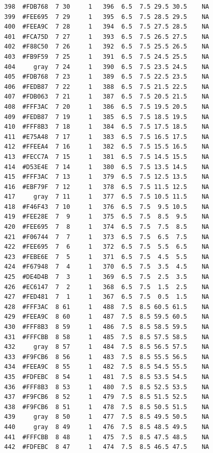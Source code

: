 \documentclass[12pt,twoside]{reedthesis}
\begin{document}
\begin{verbatim}
  398  #FDB768  7 30     1   396  6.5  7.5 29.5 30.5    NA
  399  #FEE695  7 29     1   395  6.5  7.5 28.5 29.5    NA
  400  #FEEA9C  7 28     1   394  6.5  7.5 27.5 28.5    NA
  401  #FCA75D  7 27     1   393  6.5  7.5 26.5 27.5    NA
  402  #F88C50  7 26     1   392  6.5  7.5 25.5 26.5    NA
  403  #FB9F59  7 25     1   391  6.5  7.5 24.5 25.5    NA
  404     gray  7 24     1   390  6.5  7.5 23.5 24.5    NA
  405  #FDB768  7 23     1   389  6.5  7.5 22.5 23.5    NA
  406  #FEDB87  7 22     1   388  6.5  7.5 21.5 22.5    NA
  407  #FDB063  7 21     1   387  6.5  7.5 20.5 21.5    NA
  408  #FFF3AC  7 20     1   386  6.5  7.5 19.5 20.5    NA
  409  #FEDB87  7 19     1   385  6.5  7.5 18.5 19.5    NA
  410  #FFF8B3  7 18     1   384  6.5  7.5 17.5 18.5    NA
  411  #E75A48  7 17     1   383  6.5  7.5 16.5 17.5    NA
  412  #FFEEA4  7 16     1   382  6.5  7.5 15.5 16.5    NA
  413  #FECC7A  7 15     1   381  6.5  7.5 14.5 15.5    NA
  414  #D53E4E  7 14     1   380  6.5  7.5 13.5 14.5    NA
  415  #FFF3AC  7 13     1   379  6.5  7.5 12.5 13.5    NA
  416  #EBF79F  7 12     1   378  6.5  7.5 11.5 12.5    NA
  417     gray  7 11     1   377  6.5  7.5 10.5 11.5    NA
  418  #F46F43  7 10     1   376  6.5  7.5  9.5 10.5    NA
  419  #FEE28E  7  9     1   375  6.5  7.5  8.5  9.5    NA
  420  #FEE695  7  8     1   374  6.5  7.5  7.5  8.5    NA
  421  #F06744  7  7     1   373  6.5  7.5  6.5  7.5    NA
  422  #FEE695  7  6     1   372  6.5  7.5  5.5  6.5    NA
  423  #FEBE6E  7  5     1   371  6.5  7.5  4.5  5.5    NA
  424  #F67948  7  4     1   370  6.5  7.5  3.5  4.5    NA
  425  #DE4D4B  7  3     1   369  6.5  7.5  2.5  3.5    NA
  426  #EC6147  7  2     1   368  6.5  7.5  1.5  2.5    NA
  427  #FED481  7  1     1   367  6.5  7.5  0.5  1.5    NA
  428  #FFF3AC  8 61     1   488  7.5  8.5 60.5 61.5    NA
  429  #FEEA9C  8 60     1   487  7.5  8.5 59.5 60.5    NA
  430  #FFF8B3  8 59     1   486  7.5  8.5 58.5 59.5    NA
  431  #FFFCBB  8 58     1   485  7.5  8.5 57.5 58.5    NA
  432     gray  8 57     1   484  7.5  8.5 56.5 57.5    NA
  433  #F9FCB6  8 56     1   483  7.5  8.5 55.5 56.5    NA
  434  #FEEA9C  8 55     1   482  7.5  8.5 54.5 55.5    NA
  435  #FDFEBC  8 54     1   481  7.5  8.5 53.5 54.5    NA
  436  #FFF8B3  8 53     1   480  7.5  8.5 52.5 53.5    NA
  437  #F9FCB6  8 52     1   479  7.5  8.5 51.5 52.5    NA
  438  #F9FCB6  8 51     1   478  7.5  8.5 50.5 51.5    NA
  439     gray  8 50     1   477  7.5  8.5 49.5 50.5    NA
  440     gray  8 49     1   476  7.5  8.5 48.5 49.5    NA
  441  #FFFCBB  8 48     1   475  7.5  8.5 47.5 48.5    NA
  442  #FDFEBC  8 47     1   474  7.5  8.5 46.5 47.5    NA

\end{verbatim}
\end{document}
